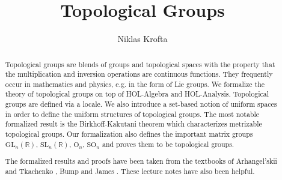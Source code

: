 \documentclass[11pt,a4paper]{article}
\begin{document}
\title{Topological Groups}
\author{Niklas Krofta}
\maketitle

\begin{abstract}
Topological groups are blends of groups and topological spaces with the property that the multiplication and inversion operations are continuous functions. 
They frequently occur in mathematics and physics, e.g. in the form of Lie groups. We formalize the theory of topological groups on top of 
HOL-Algebra and HOL-Analysis. Topological groups are defined via a locale. We also introduce a set-based notion of uniform spaces in order to define
the uniform structures of topological groups. The most notable formalized result is the Birkhoff-Kakutani theorem which characterizes 
metrizable topological groups. Our formalization also defines the important matrix groups $\mathrm{GL}_n(\mathbb{R})$, $\mathrm{SL}_n(\mathbb{R})$,
$\mathrm{O}_n$, $\mathrm{SO}_n$ and proves them to be topological groups. \newline

The formalized results and proofs have been taken from the textbooks of Arhangel’skii and Tkachenko \cite{topological_groups}, Bump \cite{lie_groups}
and James \cite{topological_and_uniform_spaces}. These lecture notes \cite{prem} have also been helpful.
\end{abstract}

\tableofcontents





\end{document}
